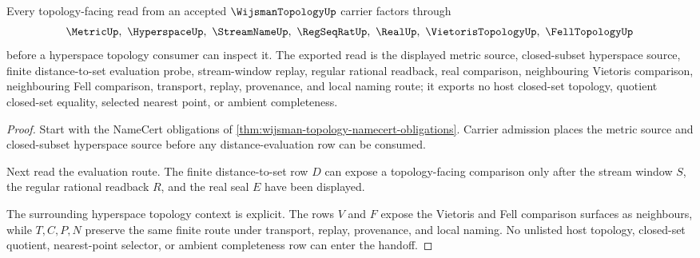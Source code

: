 \begin{theorem}
\label{thm:wijsman-topology-distance-evaluation-handoff}
Every topology-facing read from an accepted $\WijsmanTopologyUp$ carrier factors through
$$
\MetricUp,\ \HyperspaceUp,\ \StreamNameUp,\ \RegSeqRatUp,\ \RealUp,\ \VietorisTopologyUp,\ \FellTopologyUp
$$
before a hyperspace topology consumer can inspect it. The exported read is the displayed metric source, closed-subset hyperspace source, finite distance-to-set evaluation probe, stream-window replay, regular rational readback, real comparison, neighbouring Vietoris comparison, neighbouring Fell comparison, transport, replay, provenance, and local naming route; it exports no host closed-set topology, quotient closed-set equality, selected nearest point, or ambient completeness.
\end{theorem}
\begin{proof}
Start with the NameCert obligations of \autoref{thm:wijsman-topology-namecert-obligations}. Carrier admission places the metric source and closed-subset hyperspace source before any distance-evaluation row can be consumed.

Next read the evaluation route. The finite distance-to-set row $D$ can expose a topology-facing comparison only after the stream window $S$, the regular rational readback $R$, and the real seal $E$ have been displayed.

The surrounding hyperspace topology context is explicit. The rows $V$ and $F$ expose the Vietoris and Fell comparison surfaces as neighbours, while $T,C,P,N$ preserve the same finite route under transport, replay, provenance, and local naming. No unlisted host topology, closed-set quotient, nearest-point selector, or ambient completeness row can enter the handoff.
\end{proof}



